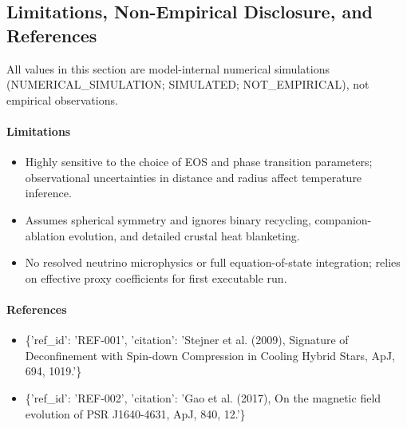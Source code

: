 \documentclass[11pt]{article}
\begin{document}
\subsection{Limitations, Non-Empirical Disclosure, and References}

\noindent All values in this section are model-internal numerical simulations (NUMERICAL\_SIMULATION; SIMULATED; NOT\_EMPIRICAL), not empirical observations.

\paragraph{Limitations}
\begin{itemize}\raggedright
\item Highly sensitive to the choice of EOS and phase transition parameters; observational uncertainties in distance and radius affect temperature inference.
\item Assumes spherical symmetry and ignores binary recycling, companion-ablation evolution, and detailed crustal heat blanketing.
\item No resolved neutrino microphysics or full equation-of-state integration; relies on effective proxy coefficients for first executable run.
\end{itemize}

\paragraph{References}
\begin{itemize}\raggedright
\item \{'ref\_\allowbreak{}id': 'REF-001', 'citation': 'Stejner et al. (2009), Signature of Deconfinement with Spin-down Compression in Cooling Hybrid Stars, ApJ, 694, 1019.'\}
\item \{'ref\_\allowbreak{}id': 'REF-002', 'citation': 'Gao et al. (2017), On the magnetic field evolution of PSR J1640-4631, ApJ, 840, 12.'\}
\end{itemize}
\end{document}
